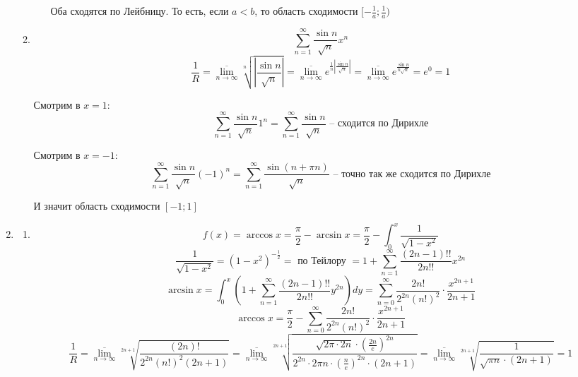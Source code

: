 \documentclass[11pt]{article}
\begin{document}
\begin{enumerate}
\begin{enumerate}
\begin{itemize}
				Оба сходятся по Лейбницу. То есть, если $a<b$, то область сходимости $[-\frac{1}{a};\frac{1}{a})$
			\end{itemize}
		\item $$\sum_{n=1}^{\infty} \frac{\sin n}{\sqrt{n}}x^n$$
		$$ \frac{1}{R} = \overline{\lim_{n\to \infty}}\sqrt[n]{\left| \frac{\sin n}{\sqrt{n}} \right|} =\overline{\lim_{n\to \infty}} e^{\frac{1}{n}\left| \frac{\sin n}{\sqrt{n}} \right|} = \overline{\lim_{n\to \infty}} e^{\frac{\sin n}{n\sqrt{n}}}=e^0=1$$
		
		Смотрим в $x=1$:
		$$ \sum_{n=1}^{\infty} \frac{\sin n}{\sqrt{n}}1^n=\sum_{n=1}^{\infty} \frac{\sin n}{\sqrt{n}}\text{ -- сходится по Дирихле} $$
		
		Смотрим в $x=-1$:
		$$ \sum_{n=1}^{\infty} \frac{\sin n}{\sqrt{n}}(-1)^n=\sum_{n=1}^{\infty} \frac{\sin (n+\pi n)}{\sqrt{n}}\text{ -- точно так же сходится по Дирихле} $$
		
		И значит область сходимости $\left[-1;1\right]$
		\end{enumerate}
	\item \begin{enumerate}
		\item $$f(x) = \arccos x = \frac{\pi}{2}-\arcsin x = \frac{\pi}{2}-\int_{0}^{x} \frac{1}{\sqrt{1-x^2}} $$
		$$ \frac{1}{\sqrt{1-x^2}} = (1-x^2)^{-\frac{1}{2}} = \text{ по Тейлору }=1+\sum_{n = 1}^{\infty} \frac{(2n-1)!!}{2n!!} x^{2n} $$
		$$ \arcsin x = \int_{0}^{x} \left( 1 + \sum_{n = 1}^{\infty} \frac{(2n-1)!!}{2n!!} y^{2n}  \right)dy = \sum_{n=0}^{\infty} \frac{2n!}{2^{2n}(n!)^2}\cdot \frac{x^{2n+1}}{2n+1} $$
		$$ \arccos x = \frac{\pi}{2} - \sum_{n=0}^{\infty} \frac{2n!}{2^{2n}(n!)^2}\cdot \frac{x^{2n+1}}{2n+1} $$
		$$ \frac{1}{R} = \overline{\lim_{n\to \infty}}\sqrt[2n+1]{\frac{(2n)!}{2^{2n}(n!)^2(2n+1)}} = \overline{\lim_{n\to \infty}} \sqrt[2n+1]{\frac{\sqrt{2\pi \cdot 2n}\cdot \left(\frac{2n}{e}\right)^{2n}}{ 2^{2n}\cdot 2\pi n\cdot \left(\frac{n}{e}\right)^{2n}\cdot (2n+1) }} = \overline{\lim_{n\to \infty}} \sqrt[2n+1]{\frac{1}{\sqrt{\pi n}\cdot (2n+1)}}=1 $$
		

\end{enumerate}
\end{enumerate}
\end{document}
